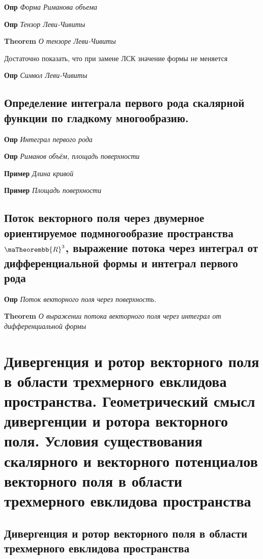 \documentclass[a4paper, 14pt]{article}
\begin{document}
    \textbf{Опр} \textit{Форма Риманова объема}
    
    \textbf{Опр} \textit{Тензор Леви-Чивиты}
    
    \textbf{Theorem} \textit{О тензоре Леви-Чивиты}
    
    Достаточно показать, что при замене ЛСК значение формы не меняется
    
    \textbf{Опр} \textit{Символ Леви-Чивиты}
    
    \subsection{Определение интеграла первого рода скалярной функции по гладкому многообразию.}
    
    \textbf{Опр} \textit{Интеграл первого рода}
    
    \textbf{Опр} \textit{Риманов объём, площадь поверхности}
    
    \textbf{Пример} \textit{Длина кривой}
    
    \textbf{Пример} \textit{Площадь поверхности}
    
    \subsection{Поток векторного поля через двумерное ориентируемое подмногообразие пространства $\maTheorembb{R}^3$,
        выражение потока через интеграл от дифференциальной формы и интеграл первого рода}
    
    \textbf{Опр} \textit{Поток векторного поля через поверхность.}
    
    \textbf{Theorem} \textit{О выражении потока векторного поля через интеграл от дифференциальной формы}
    
    \section{Дивергенция и ротор векторного поля в области трехмерного евклидова пространства.
    Геометрический смысл дивергенции и ротора векторного поля.
    Условия существования скалярного и векторного потенциалов векторного поля в области трехмерного евклидова
    пространства}
    
    \subsection{Дивергенция и ротор векторного поля в области трехмерного евклидова пространства}
    
\end{document}
